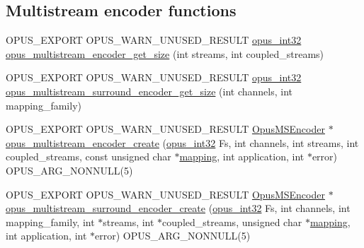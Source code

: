 \subsection*{Multistream encoder functions}
\begin{DoxyCompactItemize}
\item 
O\+P\+U\+S\+\_\+\+E\+X\+P\+O\+RT O\+P\+U\+S\+\_\+\+W\+A\+R\+N\+\_\+\+U\+N\+U\+S\+E\+D\+\_\+\+R\+E\+S\+U\+LT \mbox{\hyperlink{opus__types_8h_aa4d309d6f80b99dbabebc8f98879ab9a}{opus\+\_\+int32}} \mbox{\hyperlink{group__opus__multistream_ga598e82225e53af23017e0c96f4eaf3b4}{opus\+\_\+multistream\+\_\+encoder\+\_\+get\+\_\+size}} (int streams, int coupled\+\_\+streams)
\item 
O\+P\+U\+S\+\_\+\+E\+X\+P\+O\+RT O\+P\+U\+S\+\_\+\+W\+A\+R\+N\+\_\+\+U\+N\+U\+S\+E\+D\+\_\+\+R\+E\+S\+U\+LT \mbox{\hyperlink{opus__types_8h_aa4d309d6f80b99dbabebc8f98879ab9a}{opus\+\_\+int32}} \mbox{\hyperlink{group__opus__multistream_ga21bf3d342217f28822f676b17bd21144}{opus\+\_\+multistream\+\_\+surround\+\_\+encoder\+\_\+get\+\_\+size}} (int channels, int mapping\+\_\+family)
\item 
O\+P\+U\+S\+\_\+\+E\+X\+P\+O\+RT O\+P\+U\+S\+\_\+\+W\+A\+R\+N\+\_\+\+U\+N\+U\+S\+E\+D\+\_\+\+R\+E\+S\+U\+LT \mbox{\hyperlink{group__opus__multistream_gae5826674d142fc873ebc1d781c507dd7}{Opus\+M\+S\+Encoder}} $\ast$ \mbox{\hyperlink{group__opus__multistream_ga984c19f4faa4db82370eb907f8eaf452}{opus\+\_\+multistream\+\_\+encoder\+\_\+create}} (\mbox{\hyperlink{opus__types_8h_aa4d309d6f80b99dbabebc8f98879ab9a}{opus\+\_\+int32}} Fs, int channels, int streams, int coupled\+\_\+streams, const unsigned char $\ast$\mbox{\hyperlink{_s_d_l__opengl__glext_8h_aa4f194e5160ccbb5a8e83ab6ef4676d2}{mapping}}, int application, int $\ast$error) O\+P\+U\+S\+\_\+\+A\+R\+G\+\_\+\+N\+O\+N\+N\+U\+LL(5)
\item 
O\+P\+U\+S\+\_\+\+E\+X\+P\+O\+RT O\+P\+U\+S\+\_\+\+W\+A\+R\+N\+\_\+\+U\+N\+U\+S\+E\+D\+\_\+\+R\+E\+S\+U\+LT \mbox{\hyperlink{group__opus__multistream_gae5826674d142fc873ebc1d781c507dd7}{Opus\+M\+S\+Encoder}} $\ast$ \mbox{\hyperlink{group__opus__multistream_ga1358d7af19572d163ec982447aa20ee9}{opus\+\_\+multistream\+\_\+surround\+\_\+encoder\+\_\+create}} (\mbox{\hyperlink{opus__types_8h_aa4d309d6f80b99dbabebc8f98879ab9a}{opus\+\_\+int32}} Fs, int channels, int mapping\+\_\+family, int $\ast$streams, int $\ast$coupled\+\_\+streams, unsigned char $\ast$\mbox{\hyperlink{_s_d_l__opengl__glext_8h_aa4f194e5160ccbb5a8e83ab6ef4676d2}{mapping}}, int application, int $\ast$error) O\+P\+U\+S\+\_\+\+A\+R\+G\+\_\+\+N\+O\+N\+N\+U\+LL(5)

\end{DoxyCompactItemize}
